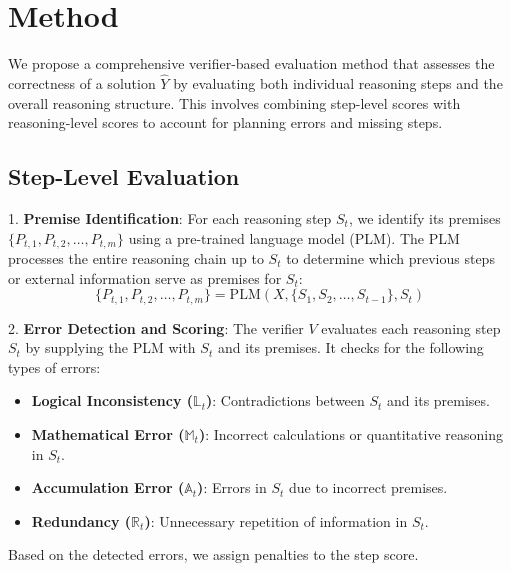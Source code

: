 \section*{Method}

We propose a comprehensive verifier-based evaluation method that assesses the correctness of a solution \( \hat{Y} \) by evaluating both individual reasoning steps and the overall reasoning structure. This involves combining step-level scores with reasoning-level scores to account for planning errors and missing steps.

\subsection*{Step-Level Evaluation}

1. \textbf{Premise Identification}:  
   For each reasoning step \( S_t \), we identify its premises \( \{P_{t,1}, P_{t,2}, \ldots, P_{t,m}\} \) using a pre-trained language model (PLM). The PLM processes the entire reasoning chain up to \( S_t \) to determine which previous steps or external information serve as premises for \( S_t \):
   \[
   \{P_{t,1}, P_{t,2}, \ldots, P_{t,m}\} = \mathrm{PLM}(X, \{S_1, S_2, \ldots, S_{t-1}\}, S_t)
   \]

2. \textbf{Error Detection and Scoring}:  
   The verifier \( V \) evaluates each reasoning step \( S_t \) by supplying the PLM with \( S_t \) and its premises. It checks for the following types of errors:
   \begin{itemize}
       \item \textbf{Logical Inconsistency (\( \mathbb{L}_t \))}: Contradictions between \( S_t \) and its premises.
       \item \textbf{Mathematical Error (\( \mathbb{M}_t \))}: Incorrect calculations or quantitative reasoning in \( S_t \).
       \item \textbf{Accumulation Error (\( \mathbb{A}_t \))}: Errors in \( S_t \) due to incorrect premises.
       \item \textbf{Redundancy (\( \mathbb{R}_t \))}: Unnecessary repetition of information in \( S_t \).
   \end{itemize}

   Based on the detected errors, we assign penalties to the step score.

